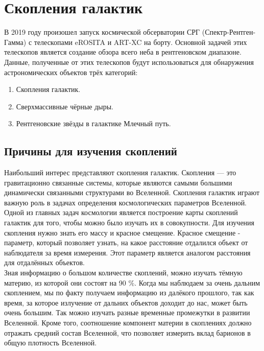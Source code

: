 \Introduction
\section{Скопления галактик}
В 2019 году произошел запуск космической обсерватории СРГ (Спектр-Рентген-Гамма) с телескопами 
eROSITA и ART-XC на борту. Основной задачей этих телескопов является создание обзора всего неба в 
рентгеновском диапазоне. Данные, полученные от этих телескопов будут использоваться для обнаружения 
астрономических объектов трёх категорий:

\begin{enumerate}
    \item Скопления галактик.
    \item Сверхмассивные чёрные дыры.
    \item Рентгеновские звёзды в галактике Млечный путь. 
\end{enumerate}

\subsection{Причины для изучения скоплений}

Наибольший интерес представляют скопления галактик. Скопления --- это гравитационно связанные 
системы, которые являются самыми большими динамически связанными структурами во Вселенной. 
Скопления галактик играют важную роль в задачах определения космологических параметров Вселенной.\\

Одной из главных задач космологии является построение карты скоплений галактик для того, чтобы 
можно было изучать их в совокупности. Для изучения скопления нужно знать его массу и красное 
смещение. Красное смещение - параметр, который позволяет узнать, на какое расстояние отдалился 
объект от наблюдателя за время измерения. Этот параметр является аналогом расстояния для отдалённых 
объектов. \\

Зная информацию о большом количестве скоплений, можно изучать тёмную материю, из которой 
они состоят на 90 \%. Когда мы наблюдаем за очень дальним скоплением, мы по факту получаем 
информацию из далёкого прошлого, так как время, за которое излучение от дальних объектов доходит до 
нас, может быть очень большим. Так можно изучать разные временные промежутки в развитии Вселенной.
Кроме того, соотношение компонент материи в 
скоплениях должно отражать средний состав Вселенной, что позволяет измерить вклад барионов в общую
плотность Вселенной.\\

